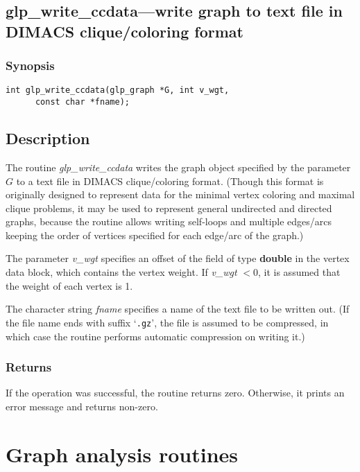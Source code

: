 \documentclass[dvipdfm,11pt]{report}
\begin{document}
\subsection{glp\_write\_ccdata---write graph to text file in DIMACS
clique/coloring format}

\subsubsection*{Synopsis}

\begin{verbatim}
int glp_write_ccdata(glp_graph *G, int v_wgt,
      const char *fname);
\end{verbatim}

\subsection*{Description}

The routine {\it glp\_write\_ccdata} writes the graph object specified
by the parameter $G$ to a text file in DIMACS clique/coloring format.
(Though this format is originally designed to represent data for the
minimal vertex coloring and maximal clique problems, it may be used to
represent general undirected and directed graphs, because the routine
allows writing self-loops and multiple edges/arcs keeping the order of
vertices specified for each edge/arc of the graph.)

The parameter {\it v\_wgt} specifies an offset of the field of type
{\bf double} in the vertex data block, which contains the vertex weight.
If {\it v\_wgt} $<0$, it is assumed that the weight of each vertex is 1.

The character string {\it fname} specifies a name of the text file to be
written out. (If the file name ends with suffix `\verb|.gz|', the file
is assumed to be compressed, in which case the routine performs
automatic compression on writing it.)

\subsubsection*{Returns}

If the operation was successful, the routine returns zero. Otherwise,
it prints an error message and returns non-zero.

\newpage

\section{Graph analysis routines}
\end{document}
